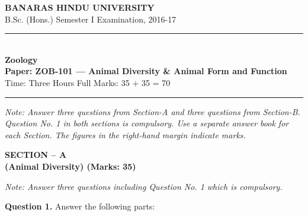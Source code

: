 \documentclass[11pt,a4paper]{article}
\begin{document}
\begin{center}
  {\large\bfseries BANARAS HINDU UNIVERSITY}\\[2pt]
  {\normalsize B.Sc. (Hons.) Semester I Examination, 2016-17}\\[6pt]
  \rule{0.8\linewidth}{0.5pt}\\[6pt]
  {\large\bfseries Zoology}\\[4pt]
  {\large\bfseries Paper: ZOB-101 --- Animal Diversity \& Animal Form and Function}\\[4pt]
  {\normalsize Time: Three Hours \hfill Full Marks: 35 + 35 = 70}
\end{center}

\rule{\linewidth}{0.4pt}

\smallskip



\noindent   \textit{Note: Answer three questions from Section-A and three questions from Section-B. Question No. 1 in both sections is compulsory. Use a separate answer book for each Section. The figures in the right-hand margin indicate marks.}

\bigskip

\begin{center}
   \textbf{SECTION -- A} \\
   \textbf{(Animal Diversity) (Marks: 35)}
\end{center}

\smallskip



\noindent   \textit{Note: Answer three questions including Question No. 1 which is compulsory.}

\medskip


\noindent   \textbf{Question 1.} Answer the following parts:
\end{document}
